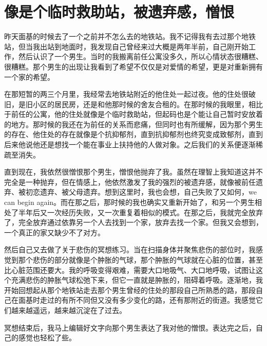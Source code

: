 \chapter{像是个临时救助站，被遗弃感，憎恨}





昨天面基的时候去了一个之前并不怎么去的地铁站。我不记得我有去过那个地铁站，但当我出站到地面时，我发现自己曾经来过\pozhehao{}大概是两年半前，自己刚开始工作，然后认识了一个男生。当时的我搬离前任公寓没多久，所以心情状态很糟糕、很糟糕。那个男生的出现让我看到了希望\pozhehao{}不仅仅是对爱情的希望，更是对重新拥有一个家的希望。

在那短暂的两三个月里，我经常去地铁站附近的他住处一起过夜。他的住处很破旧，是旧小区的居民房，还是和他那时候的舍友合租的。在那时候的我眼里，相比于前任的公寓，他的住处就像是个临时救助站，但起码也是个能让自己暂时安放着的地方。那时候的我还在为前任的关系而悲痛，但同时也有所缓解，因为那个男生的存在、他住处的存在就像是个抗抑郁剂，直到抗抑郁剂也终究变成致郁剂，直到后来他说他还是想找一个能在事业上扶持他的人做对象。之后我们的关系便逐渐稀疏至消失。

直到现在，我依然很憎恨那个男生，憎恨他抛弃了我。虽然在理智上我知道这并不完全是一种抛弃，但在情感上，他依然激发了我的强烈的被遗弃感，就像被前任遗弃、被初恋遗弃、被父母遗弃。想到这里时，我也会想，自己失败了又如何，we can begin again。而在那之后，那时候的我也确实又重新开始了，和另一个男生相处了半年后又一次经历失败，又一次重复着相似的模式。在那之后，我就完全放弃了，完全放弃通过依靠另一个人去找到一个家，放弃去找一个家。但我又会想到，一个真正的家又缺少不了对方。

然后自己又去做了关于悲伤的冥想练习。当在扫描身体并聚焦悲伤的部位时，我感觉到那个悲伤的部分就像是个肿胀的气球，那个肿胀的气球就在心脏的位置，甚至比心脏范围还要大。我的呼吸变得艰难，需要大口地吸气、大口地呼吸，试图让这个充满悲伤的肿胀气球松弛下来，但它一直就是肿胀的，阻碍着呼吸。逐渐地，我开始回想起从那个地铁站走去那个男生曾经的住处的那段自己所熟悉的路，那段自己在面基时走过的有所不同但又没有多少变化的路，还有那附近的街道。我感觉它们越来越遥远，越来越沉淀在了过去。

冥想结束后，我马上编辑好文字向那个男生表达了我对他的憎恨。表达完之后，自己的感觉也轻松了些。


